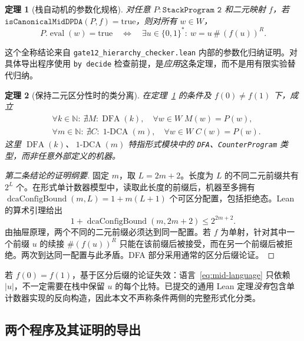 \documentclass[11pt,a4paper,UTF8,fontset=none]{ctexart}
\newtheorem{theorem}{定理}[section]
\newcommand{\DFA}{\operatorname{DFA}}
\newcommand{\oneDCA}{\operatorname{1\text{-}DCA}}
\begin{document}
\begin{theorem}[栈自动机的参数化规格]\label{thm:dpda}
对任意 $P:\texttt{StackProgram 2}$ 和二元映射 $f$，若 $\texttt{isCanonicalMidDPDA}(P,f)=\mathrm{true}$，则对所有 $w\in W$，
\begin{equation}\label{eq:dpda-sound}
P.\operatorname{eval}(w)=\mathrm{true}
\quad\Longleftrightarrow\quad
\exists u\in\{0,1\}^*:\ w=u\,\#\,(f(u))^R.
\end{equation}
\end{theorem}
这个全称结论来自 \texttt{gate12\_hierarchy\_checker.lean} 内部的参数化归纳证明。对具体导出程序使用 \texttt{by decide} 检查前提，是\emph{应用}这条定理，而不是用有限实验替代归纳。

\begin{theorem}[保持二元区分性时的类分离]\label{thm:separation}
在定理~\ref{thm:dpda} 的条件及 $f(0)\ne f(1)$ 下，成立
\begin{equation}\label{eq:global-sep}
\begin{aligned}
&\forall k\in\mathbb N:\ \nexists M:\DFA(k),\quad
  \forall w\in W\; M(w)=P(w),\\
&\forall m\in\mathbb N:\ \nexists C:\oneDCA(m),\quad
  \forall w\in W\; C(w)=P(w).
\end{aligned}
\end{equation}
这里 $\DFA(k)$、$\oneDCA(m)$ 特指形式模块中的 \texttt{DFA}、\texttt{CounterProgram} 类型，而非任意外部定义的机器。
\end{theorem}

\begin{proof}[第二条结论的证明纲要]
固定 $m$，取 $L=2m+2$。长度为 $L$ 的不同二元前缀共有 $2^L$ 个。在形式单计数器模型中，读取此长度的前缀后，机器至多拥有 $\operatorname{dcaConfigBound}(m,L)=1+m(L+1)$ 个可区分配置，包括拒绝态。Lean 的算术引理给出
\begin{equation}\label{eq:dca-bound}
1+\operatorname{dcaConfigBound}(m,2m+2)\le 2^{2m+2}.
\end{equation}
由抽屉原理，两个不同的二元前缀必须达到同一配置。若 $f$ 为单射，针对其中一个前缀 $u$ 的续接 $\#(f(u))^R$ 只能在该前缀后被接受，而在另一个前缀后被拒绝。两次到达同一配置与此矛盾。DFA 部分采用通常的区分后缀论证。
\end{proof}

若 $f(0)=f(1)$，基于区分后缀的论证失效：语言~\eqref{eq:mid-language} 只依赖 $|u|$，不一定需要在栈中保留 $u$ 的每个比特。已提交的通用 Lean 定理\emph{没有}包含单计数器实现的反向构造，因此本文不声称条件两侧的完整形式化分类。

\subsection{两个程序及其证明的导出}
\end{document}

